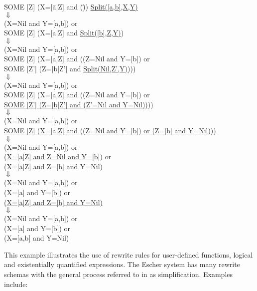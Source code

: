\begin{ttfamily}
\small
\begin{tabbing}
\hspace*{1cm}\=SOME [Z] (X=[\= a|Z] and (\=))\kill
\>\underline{Split([a,b],X,Y)}\\
\>\>$\Downarrow$\\
\>(X=Nil and Y=[a,b]) or\\
\>SOME [Z] (X=[a|Z] and \underline{Split([b],Z,Y)})\\
\>\>$\Downarrow$\\
\>(X=Nil and Y=[a,b]) or\\
\>SOME [Z] (X=[a|Z] and ((Z=Nil and Y=[b]) or\\
\>\>\>SOME [Z'] (Z=[b|Z'] and \underline{Split(Nil,Z',Y)})))\\
\>\>$\Downarrow$\\
\>(X=Nil and Y=[a,b]) or\\
\>SOME [Z] (X=[a|Z] and ((Z=Nil and Y=[b]) or\\
\>\>\>\underline{SOME [Z'] (Z=[b|Z'] and (Z'=Nil and Y=Nil))}))\\
\>\>$\Downarrow$\\
\>(X=Nil and Y=[a,b]) or\\
\>\underline{SOME [Z] (X=[a|Z] and ((Z=Nil and Y=[b]) or (Z=[b] and Y=Nil)))}\\
\>\>$\Downarrow$\\
\>(X=Nil and Y=[a,b]) or\\
\>\underline{(X=[a|Z] and Z=Nil and Y=[b])} or\\
\>(X=[a|Z] and Z=[b] and Y=Nil)\\
\>\>$\Downarrow$\\
\>(X=Nil and Y=[a,b]) or\\
\>(X=[a] and Y=[b]) or\\
\>\underline{(X=[a|Z] and Z=[b] and Y=Nil)}\\
\>\>$\Downarrow$\\
\>(X=Nil and Y=[a,b]) or\\
\>(X=[a] and Y=[b]) or\\
\>(X=[a,b] and Y=Nil)\\
\end{tabbing}
\end{ttfamily}

This example illustrates the use of rewrite rules for user-defined functions, logical and
existentially quantified expressions. The
Escher system has many rewrite schemas
with the general process referred to in \cite{Llo94} as simplification.  Examples include:

